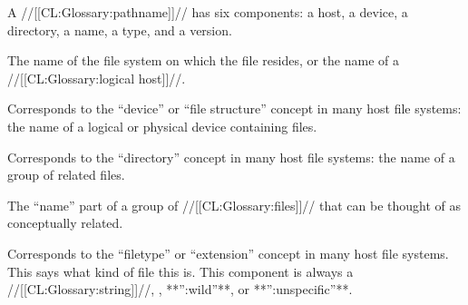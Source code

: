 











A //[[CL:Glossary:pathname]]// has six components:
     a host,
     a device,
     a directory,
     a name,
     a type,
 and a version.






The name of the file system on which the file resides,
or the name of a //[[CL:Glossary:logical host]]//.



\endsubsubsection%


Corresponds to the ``device'' or ``file structure'' concept in many
host file systems: the name of a logical or physical device containing files.



\endsubsubsection%



Corresponds to the ``directory'' concept in many host file systems:
the name of a group of related files.



\endsubsubsection%



The ``name'' part of a group of //[[CL:Glossary:files]]// that can be thought of
as conceptually related.



\endsubsubsection%




Corresponds to the ``filetype'' or ``extension'' concept in many host
file systems.  This says what kind of file this is.  
This component is always a //[[CL:Glossary:string]]//, \nil, **'':wild''**, or **'':unspecific''**.



\endsubsubsection%



